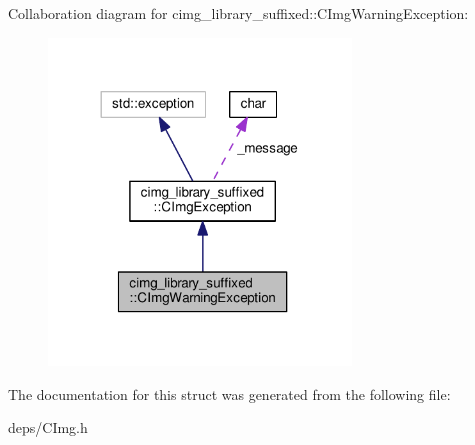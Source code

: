 Collaboration diagram for cimg\+\_\+library\+\_\+suffixed\+:\+:C\+Img\+Warning\+Exception\+:
\nopagebreak
\begin{figure}[H]
\begin{center}
\leavevmode
\includegraphics[width=228pt]{df/d29/structcimg__library__suffixed_1_1CImgWarningException__coll__graph}
\end{center}
\end{figure}


The documentation for this struct was generated from the following file\+:\begin{DoxyCompactItemize}
\item 
deps/C\+Img.\+h\end{DoxyCompactItemize}
